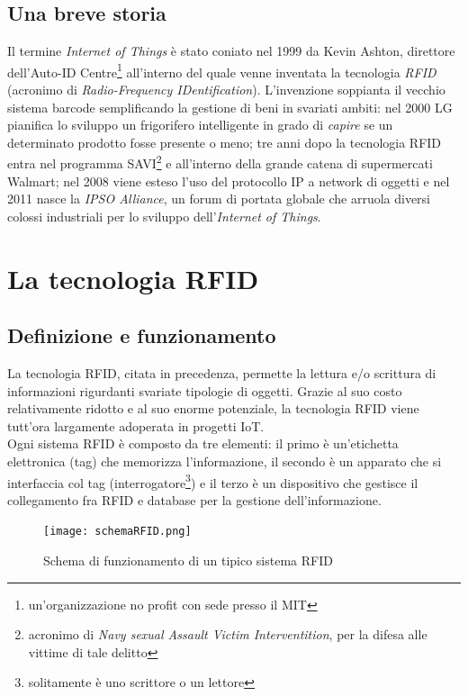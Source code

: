 \documentclass[a4paper,titlepage]{report}
\begin{document}
\section{Una breve storia}
Il termine {\itshape Internet of Things} è stato coniato nel 1999 da Kevin Ashton, direttore dell'Auto-ID Centre\footnote{un'organizzazione no profit con sede presso il MIT} all'interno del quale venne inventata la tecnologia {\itshape RFID} (acronimo di {\itshape Radio-Frequency IDentification}). L'invenzione soppianta il vecchio sistema barcode semplificando la gestione di beni in svariati ambiti: nel 2000 LG pianifica lo sviluppo un frigorifero intelligente in grado di {\itshape capire} se un determinato prodotto fosse presente o meno; tre anni dopo la tecnologia RFID entra nel programma SAVI\footnote{acronimo di {\itshape Navy sexual Assault Victim Interventition}, per la difesa alle vittime di tale delitto} e all'interno della grande catena di supermercati Walmart; nel 2008 viene esteso l'uso del protocollo IP a network di oggetti e nel 2011 nasce la {\itshape IPSO Alliance}, un forum di portata globale che arruola diversi colossi industriali per lo sviluppo dell’{\itshape Internet of Things}\cite{Suresh:StateArtReviewIoTHistoryTechnologyFieldsDeployment}.

\chapter{La tecnologia RFID}
\section{Definizione e funzionamento}
La tecnologia RFID, citata in precedenza, permette la lettura e/o scrittura di informazioni rigurdanti svariate tipologie di oggetti. Grazie al suo costo relativamente ridotto e al suo enorme potenziale, la tecnologia RFID viene tutt'ora largamente adoperata in progetti IoT.\\Ogni sistema RFID è composto da tre elementi: il primo è un'etichetta elettronica (tag) che memorizza l'informazione, il secondo è un apparato che si interfaccia col tag (interrogatore\footnote{solitamente è uno scrittore o un lettore}) e il terzo è un dispositivo che gestisce il collegamento fra RFID e database per la gestione dell'informazione\cite{Sun:ApplicationRFIDTechnologyLogisticsInternetofThings}.
\begin{figure}[h]
\centering
\texttt{[image: schemaRFID.png]}
\caption{Schema di funzionamento di un tipico sistema RFID}
\end{figure}
\end{document}
